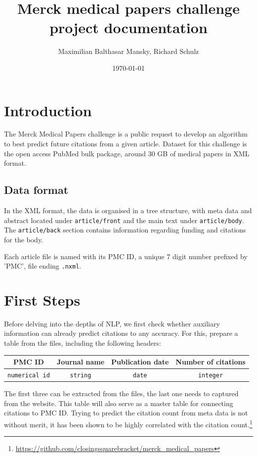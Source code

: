 \documentclass[11pt]{article}
\begin{document}
\title{Merck medical papers challenge project documentation}
\author{Maximilian Balthasar Mansky, Richard Schulz}
\date{\today}
\maketitle

\section{Introduction}

The Merck Medical Papers challenge is a public request to develop an algorithm to best predict future citations from a given article. Dataset for this challenge is the open access PubMed bulk package, around 30 GB of medical papers in XML format.

\subsection{Data format}

In the XML format, the data is organised in a tree structure, with meta data and abstract located under \texttt{article/front} and the main text under \texttt{article/body}. The \texttt{article/back} section contains information regarding funding and citations for the body.

Each article file is named with its PMC ID, a unique 7 digit number prefixed by 'PMC', file ending \texttt{.nxml}.

\section{First Steps}

Before delving into the depths of NLP, we first check whether auxiliary information can already predict citations to any accuracy. For this, prepare a table from the files, including the following headers:

\begin{table}[h!]
\begin{tabular}{c c c c}
PMC ID & Journal name & Publication date & Number of citations \\\hline
\texttt{numerical id} & \texttt{string} & \texttt{date} & \texttt{integer}
\end{tabular}
\end{table}

The first three can be extracted from the files, the last one needs to captured from the website. This table will also serve as a master table for connecting citations to PMC ID. Trying to predict the citation count from meta data is not without merit, it has been shown to be highly correlated with the citation count.\footnote{\url{https://github.com/closingsquarebracket/merck_medical_papers}}
\end{document}
